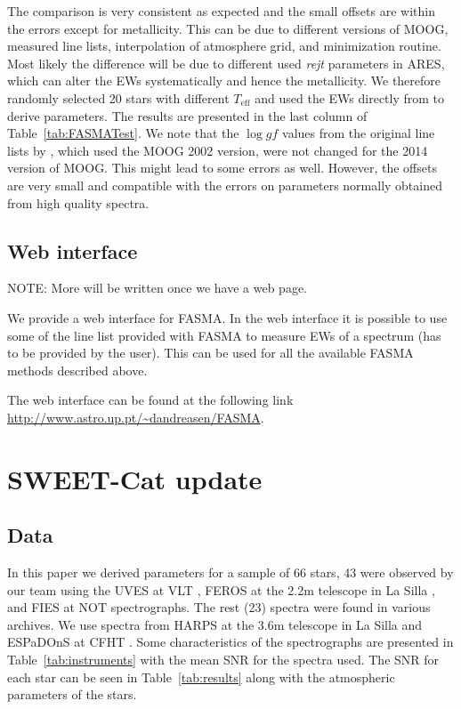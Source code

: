 \documentclass{aa}
\begin{document}
The comparison is very consistent as expected and the small offsets are within
the errors except for metallicity. This can be due to different versions of
MOOG, measured line lists, interpolation of atmosphere grid, and minimization
routine. Most likely the difference will be due to different used \emph{rejt}
parameters in ARES, which can alter the EWs systematically and hence the
metallicity. We therefore randomly selected 20 stars with different
$T_\mathrm{eff}$ and used the EWs directly from \citet{Sousa2011} to derive
parameters. The results are presented in the last column of
Table~\ref{tab:FASMATest}. We note that the $\log gf$ values from the original
line lists by \citet{Sousa2011}, which used the MOOG 2002 version, were not
changed for the 2014 version of MOOG. This might lead to some errors as well.
However, the offsets are very small and compatible with the errors on parameters
normally obtained from high quality spectra.


\subsection{Web interface}
\label{sub:Web interface}
NOTE: More will be written once we have a web page.

We provide a web interface for FASMA. In the web interface it is possible to use
some of the line list provided with FASMA to measure EWs of a spectrum (has to
be provided by the user). This can be used for all the available FASMA methods
described above.

The web interface can be found at the following link
\url{http://www.astro.up.pt/~dandreasen/FASMA}.


\section{SWEET-Cat update}

\subsection{Data}
\label{sec:data}
In this paper we derived parameters for a sample of 66 stars, 43 were observed
by our team using the UVES at VLT \citep{UVES}, FEROS at the 2.2m telescope in
La Silla \citep{FEROS}, and FIES at NOT \citep{FIES} spectrographs. The rest
(23) spectra were found in various archives. We use spectra from HARPS at the
3.6m telescope in La Silla \citep{HARPS} and ESPaDOnS at CFHT \citep{ESPADONS}.
Some characteristics of the spectrographs are presented in
Table~\ref{tab:instruments} with the mean SNR for the spectra used. The SNR for
each star can be seen in Table~\ref{tab:results} along with the atmospheric
parameters of the stars.
\end{document}

